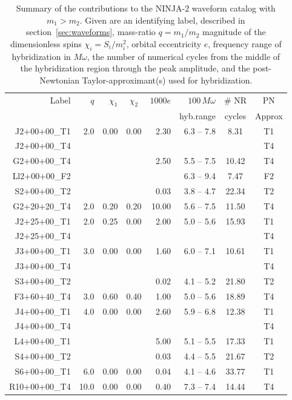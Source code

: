 %
\begin{table}
\caption[Submissions to NINJA-2]{
\label{tab:ninja2_submissions2}
Summary of the contributions to the NINJA-2 waveform catalog with $m_1
> m_2$.  Given are an identifying label, described in 
section~\ref{sec:waveforms}, 
mass-ratio $q=m_1/m_2$
magnitude of the dimensionless spins $\chi_i=S_i/m_i^2$, orbital
eccentricity $e$, frequency range of hybridization in $M\omega$, the
number of numerical cycles from the middle of the hybridization region
through the peak amplitude, and the post-Newtonian Taylor-approximant(s)
used for hybridization.
}
  \begin{tabular}{@{}rrrcrrcc}
      \hline
      Label & $q$ & $\chi_{1}$ & $\chi_{2}$ & $1000e$   & $100\,M\omega$ & \# NR 
& PN \\
      &    &     &            &            & hyb.range & cycles & Approx \\
      \hline
J2+00+00\_T1 & 2.0  &  0.00  &  0.00  &  2.30  &   6.3 -- 7.8  &  8.31  & T1\\
J2+00+00\_T4 & & & & & & & T4 \\
G2+00+00\_T4 &   &    &    &  2.50  &  5.5 -- 7.5  &  10.42  &  T4 \\
Ll2+00+00\_F2 &   &    &    &    &  6.3 -- 9.4  &  7.47  &  F2 \\
S2+00+00\_T2 &   &    &    &  0.03  &  3.8 -- 4.7  &  22.34  &  T2 \\
G2+20+20\_T4 & 2.0  &  0.20  &  0.20  &  10.00  &   5.6 -- 7.5  &  11.50  &  T4 
\\
J2+25+00\_T1 & 2.0  &  0.25  &  0.00  &  2.00  &   5.0 -- 5.6  &  15.93  & T1\\
J2+25+00\_T4 & & & & & & & T4 \\
J3+00+00\_T1 & 3.0  &  0.00  &  0.00  &  1.60  &   6.0 -- 7.1  &  10.61  & T1\\
J3+00+00\_T4 & & & & & & & T4 \\
S3+00+00\_T2 &   &    &    &  0.02  &  4.1 -- 5.2  &  21.80  &  T2 \\
F3+60+40\_T4 & 3.0  &  0.60  &  0.40  &  1.00  &   5.0 -- 5.6  &  18.89  &  T4 
\\
J4+00+00\_T1 & 4.0  &  0.00  &  0.00  &  2.60  &   5.9 -- 6.8  &  12.38  & T1\\
J4+00+00\_T4 & & & & & & & T4 \\
L4+00+00\_T1 &   &    &    &  5.00  &  5.1 -- 5.5  &  17.33  &  T1 \\
S4+00+00\_T2 &   &    &    &  0.03  &  4.4 -- 5.5  &  21.67  &  T2 \\
S6+00+00\_T1 & 6.0  &  0.00  &  0.00  &  0.04  &   4.1 -- 4.6  &  33.77  &  T1 
\\
R10+00+00\_T4 & 10.0  &  0.00  &  0.00  &  0.40  &   7.3 -- 7.4  &  14.44  &  T4 
\\
      \hline
    \end{tabular}
\end{table}

